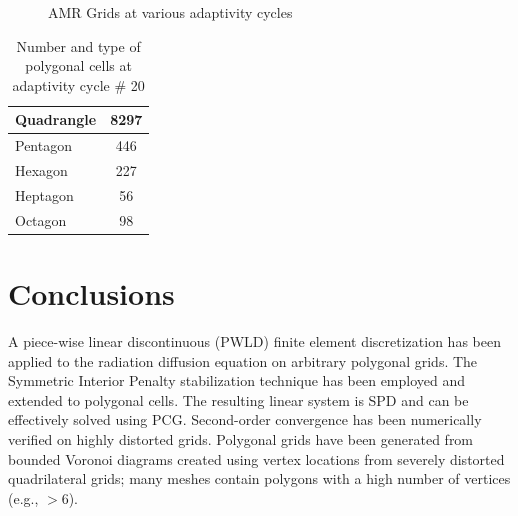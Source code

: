 \documentclass[preprint,10pt]{elsarticle}
\newcommand{\fig}[1]{Fig.~\ref{#1}}                      %
\begin{document}
\begin{figure}[!hbtp]
{\label{fig:amr_zoom}
}
\caption{AMR Grids at various adaptivity cycles}
\label{fig:amr_grids}
\end{figure}



\begin{table}[!htbp]
	\centering
		\begin{tabular}{|l||c|}
		\hline
Quadrangle&  8297  \\ \hline
Pentagon  &  446  \\ \hline
Hexagon   &  227  \\ \hline
Heptagon  &  56  \\ \hline
Octagon   &  98  \\ \hline
   \end{tabular}
	\caption{Number and type of polygonal cells at adaptivity cycle \# 20}
	\label{tab:poly_cell_types_amr_poly}
\end{table}

\section{Conclusions} \label{sec:ccl}

A piece-wise linear discontinuous (PWLD) finite element discretization has been applied to the radiation
diffusion equation on arbitrary polygonal grids. The Symmetric Interior Penalty stabilization technique
has been employed and extended to polygonal cells. The resulting linear system is SPD and can be effectively
solved using PCG. Second-order convergence has been numerically verified on highly distorted grids.
Polygonal grids have been generated from bounded Voronoi diagrams created using vertex locations from 
severely distorted quadrilateral grids; many meshes contain polygons with a high number of vertices 
(e.g., $>6$). 
\end{document}
